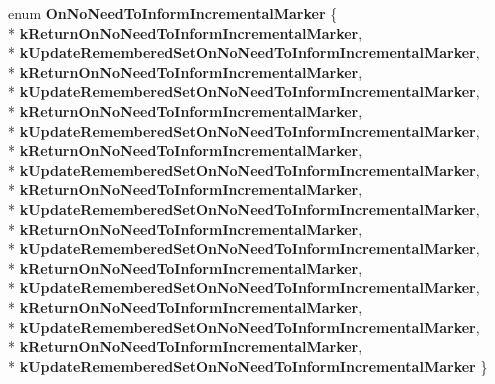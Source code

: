 \begin{DoxyCompactItemize}
\item 
enum {\bfseries On\+No\+Need\+To\+Inform\+Incremental\+Marker} \{ \\*
{\bfseries k\+Return\+On\+No\+Need\+To\+Inform\+Incremental\+Marker}, 
\\*
{\bfseries k\+Update\+Remembered\+Set\+On\+No\+Need\+To\+Inform\+Incremental\+Marker}, 
\\*
{\bfseries k\+Return\+On\+No\+Need\+To\+Inform\+Incremental\+Marker}, 
\\*
{\bfseries k\+Update\+Remembered\+Set\+On\+No\+Need\+To\+Inform\+Incremental\+Marker}, 
\\*
{\bfseries k\+Return\+On\+No\+Need\+To\+Inform\+Incremental\+Marker}, 
\\*
{\bfseries k\+Update\+Remembered\+Set\+On\+No\+Need\+To\+Inform\+Incremental\+Marker}, 
\\*
{\bfseries k\+Return\+On\+No\+Need\+To\+Inform\+Incremental\+Marker}, 
\\*
{\bfseries k\+Update\+Remembered\+Set\+On\+No\+Need\+To\+Inform\+Incremental\+Marker}, 
\\*
{\bfseries k\+Return\+On\+No\+Need\+To\+Inform\+Incremental\+Marker}, 
\\*
{\bfseries k\+Update\+Remembered\+Set\+On\+No\+Need\+To\+Inform\+Incremental\+Marker}, 
\\*
{\bfseries k\+Return\+On\+No\+Need\+To\+Inform\+Incremental\+Marker}, 
\\*
{\bfseries k\+Update\+Remembered\+Set\+On\+No\+Need\+To\+Inform\+Incremental\+Marker}, 
\\*
{\bfseries k\+Return\+On\+No\+Need\+To\+Inform\+Incremental\+Marker}, 
\\*
{\bfseries k\+Update\+Remembered\+Set\+On\+No\+Need\+To\+Inform\+Incremental\+Marker}, 
\\*
{\bfseries k\+Return\+On\+No\+Need\+To\+Inform\+Incremental\+Marker}, 
\\*
{\bfseries k\+Update\+Remembered\+Set\+On\+No\+Need\+To\+Inform\+Incremental\+Marker}, 
\\*
{\bfseries k\+Return\+On\+No\+Need\+To\+Inform\+Incremental\+Marker}, 
\\*
{\bfseries k\+Update\+Remembered\+Set\+On\+No\+Need\+To\+Inform\+Incremental\+Marker}
 \}\hypertarget{classv8_1_1internal_1_1_record_write_stub_a73c74b063dd8faec52398bc09bd68bce}{}\label{classv8_1_1internal_1_1_record_write_stub_a73c74b063dd8faec52398bc09bd68bce}


\end{DoxyCompactItemize}
